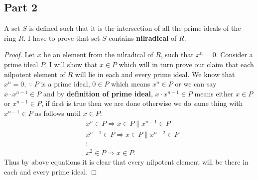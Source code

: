 \documentclass{article}
\let\bold\textbf
\begin{document}
{  \subsection{Part 2}{
    A set $S$ is defined such that it is the intersection of all the prime ideals of the ring $R$. \newline
    I have to prove that set $S$ contains \bold{nilradical} of $R$.
    \begin{proof}
      Let $x$ be an element from the nilradical of $R$, such that $x^n=0$. \newline
      Consider a prime ideal $P$, I will show that $x \in P$ which will in turn prove our claim that each nilpotent element of $R$ will lie in each and every prime ideal. \newline
      We know that $x^n=0$, $\because$ $P$ is a prime ideal, $0 \in P$ which means $x^n \in P$ or we can say $x \cdot x^{n-1} \in P$ and by \bold{definition of prime ideal}, $x \cdot x^{n-1} \in P$ means either $x \in P$ or $x^{n-1} \in P$, if first is true then we are done otherwise we do same thing with $x^{n-1} \in P$ as follows until $x \in P$:
      \begin{align*}
      &x^n \in P \Rightarrow x \in P \parallel x^{n-1} \in P \\
        &x^{n-1} \in P \Rightarrow x \in P \parallel x^{n-2} \in P \\
        &\vdots \\
        &x^2 \in P \Rightarrow x \in P.
      \end{align*}
      Thus by above equations it is clear that every nilpotent element will be there in each and every prime ideal.
    \end{proof}
  }
  \newpage
}
\end{document}
